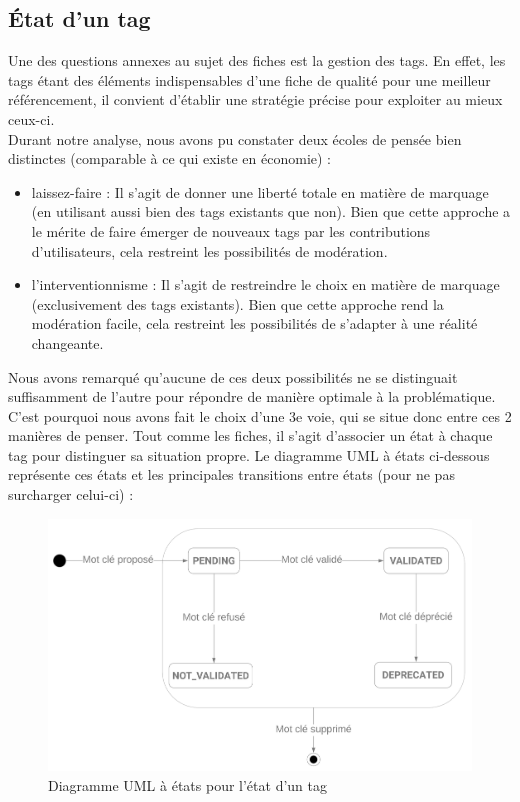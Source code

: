 \subsection*{État d'un \gls{tag}}

Une des questions annexes au sujet des \glspl{fiche} est la gestion des \glspl{tag}. En effet, les \glspl{tag} étant des éléments indispensables d'une \gls{fiche} de qualité pour une meilleur référencement, il convient d'établir une stratégie précise pour exploiter au mieux ceux-ci. \\

Durant notre analyse, nous avons pu constater deux écoles de pensée bien distinctes (comparable à ce qui existe en économie) : 
\begin{itemize}
    \item laissez-faire : Il s'agit de donner une liberté totale en matière de marquage (en utilisant aussi bien des \glspl{tag} existants que non). Bien que cette approche a le mérite de faire émerger de nouveaux \glspl{tag} par les contributions d'utilisateurs, cela restreint les possibilités de modération.
    \item l'interventionnisme : Il s'agit de restreindre le choix en matière de marquage (exclusivement des \glspl{tag} existants). Bien que cette approche rend la modération facile, cela restreint les possibilités de s'adapter à une réalité changeante.
\end{itemize}

Nous avons remarqué qu'aucune de ces deux possibilités ne se distinguait suffisamment de l'autre pour répondre de manière optimale à la problématique.
C'est pourquoi nous avons fait le choix d'une 3e voie, qui se situe donc entre ces 2 manières de penser. Tout comme les \glspl{fiche}, il s'agit d'associer un état à chaque \gls{tag} pour distinguer sa situation propre. Le diagramme UML à états ci-dessous représente ces états et les principales transitions entre états (pour ne pas surcharger celui-ci) :

\begin{figure}[H]
    \includegraphics[width=\textwidth,height=\textheight,keepaspectratio]{images/StateTags.png}
    \centering
    \caption{Diagramme UML à états pour l'état d'un \gls{tag}}
    \label{pic:stateDiagramForTags}
\end{figure}

